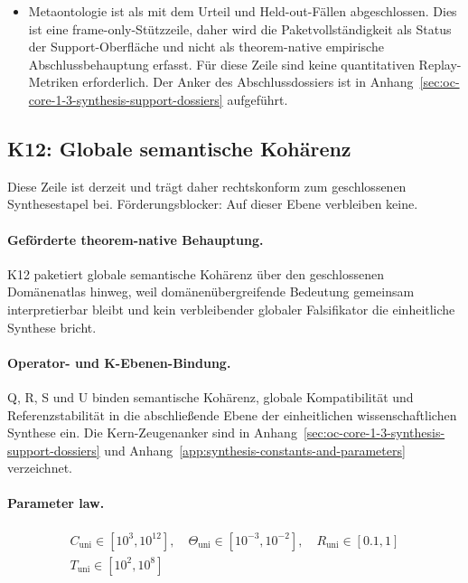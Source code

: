 \begin{itemize}[leftmargin=1.6em,nosep]
\item Metaontologie ist als  mit dem Urteil  und  Held-out-Fällen abgeschlossen. Dies ist eine frame-only-Stützzeile, daher wird die Paketvollständigkeit als Status der Support-Oberfläche und nicht als theorem-native empirische Abschlussbehauptung erfasst. Für diese Zeile sind keine quantitativen Replay-Metriken erforderlich. Der Anker des Abschlussdossiers ist in Anhang~\ref{sec:oc-core-1-3-synthesis-support-dossiers} aufgeführt.
\end{itemize}

\subsection{K12: Globale semantische Kohärenz}
\label{sec:oc-core-1-3-synthesis-k12}
Diese Zeile ist derzeit  und trägt daher rechtskonform zum geschlossenen Synthesestapel bei.
Förderungsblocker: Auf dieser Ebene verbleiben keine.

\paragraph{Geförderte theorem-native Behauptung.}
K12 paketiert globale semantische Kohärenz über den geschlossenen Domänenatlas hinweg, weil domänenübergreifende Bedeutung gemeinsam interpretierbar bleibt und kein verbleibender globaler Falsifikator die einheitliche Synthese bricht.

\paragraph{Operator- und K-Ebenen-Bindung.}
Q, R, S und U binden semantische Kohärenz, globale Kompatibilität und Referenzstabilität in die abschließende Ebene der einheitlichen wissenschaftlichen Synthese ein.
Die Kern-Zeugenanker sind in Anhang~\ref{sec:oc-core-1-3-synthesis-support-dossiers} und Anhang~\ref{app:synthesis-constants-and-parameters} verzeichnet.

\paragraph{Parameter law.}
\[
\begin{gathered} C_{\mathrm{uni}} \in [10^3,10^{12}],\quad \Theta_{\mathrm{uni}} \in [10^{-3},10^{-2}],\quad R_{\mathrm{uni}} \in [0.1,1] \\ T_{\mathrm{uni}} \in [10^2,10^8] \end{gathered}
\]

